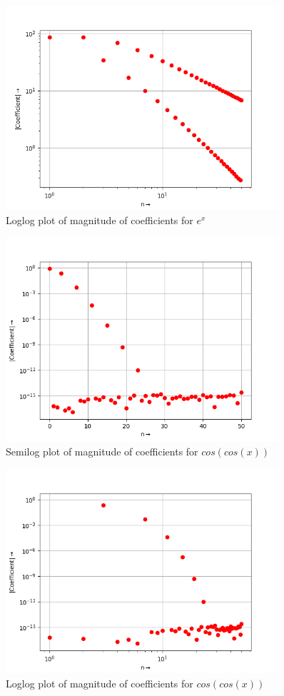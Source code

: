 \documentclass[10pt,a4paper]{article}
\begin{document}
\begin{figure}[!tbh]
\includegraphics[width = 0.9\textwidth]{3a2.png}
\caption{Loglog plot of magnitude of coefficients for $e^{x}$}
\end{figure} 

\begin{figure}[!tbh]
\includegraphics[width = 0.9\textwidth]{3b1.png}
\caption{Semilog plot of magnitude of coefficients for $cos(cos(x))$}
\end{figure} 

\begin{figure}[!tbh]
\includegraphics[width = 0.9\textwidth]{3b2.png}
\caption{Loglog plot of magnitude of coefficients for $cos(cos(x))$}
\end{figure} 
\end{document}

